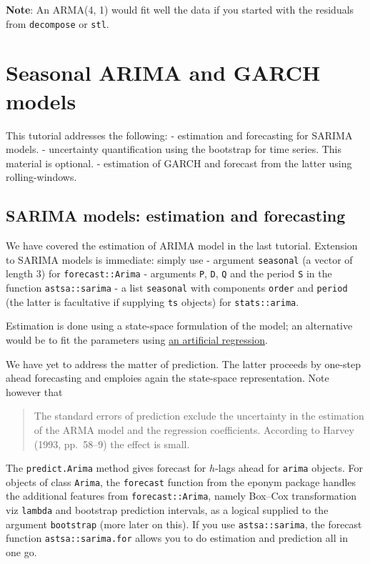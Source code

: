 \documentclass[]{book}
\begin{document}
\textbf{Note}: An ARMA(4, 1) would fit well the data if you started with
the residuals from \texttt{decompose} or \texttt{stl}.

\hypertarget{seasonal-arima-and-garch-models}{%
\chapter{Seasonal ARIMA and GARCH
models}\label{seasonal-arima-and-garch-models}}

This tutorial addresses the following: - estimation and forecasting for
SARIMA models. - uncertainty quantification using the bootstrap for time
series. This material is optional. - estimation of GARCH and forecast
from the latter using rolling-windows.

\hypertarget{sarima-models-estimation-and-forecasting}{%
\section{SARIMA models: estimation and
forecasting}\label{sarima-models-estimation-and-forecasting}}

We have covered the estimation of ARIMA model in the last tutorial.
Extension to SARIMA models is immediate: simply use - argument
\texttt{seasonal} (a vector of length 3) for \texttt{forecast::Arima} -
arguments \texttt{P}, \texttt{D}, \texttt{Q} and the period \texttt{S}
in the function \texttt{astsa::sarima} - a list \texttt{seasonal} with
components \texttt{order} and \texttt{period} (the latter is facultative
if supplying \texttt{ts} objects) for \texttt{stats::arima}.

Estimation is done using a state-space formulation of the model; an
alternative would be to fit the parameters using
\href{http://russell-davidson.arts.mcgill.ca/e761/mlzero3.pdf}{an
artificial regression}.

We have yet to address the matter of prediction. The latter proceeds by
one-step ahead forecasting and emploies again the state-space
representation. Note however that

\begin{quote}
The standard errors of prediction exclude the uncertainty in the
estimation of the ARMA model and the regression coefficients. According
to Harvey (1993, pp.~58--9) the effect is small.
\end{quote}

The \texttt{predict.Arima} method gives forecast for \(h\)-lags ahead
for \texttt{arima} objects. For objects of class \texttt{Arima}, the
\texttt{forecast} function from the eponym package handles the
additional features from \texttt{forecast::Arima}, namely Box--Cox
transformation viz \texttt{lambda} and bootstrap prediction intervals,
as a logical supplied to the argument \texttt{bootstrap} (more later on
this). If you use \texttt{astsa::sarima}, the forecast function
\texttt{astsa::sarima.for} allows you to do estimation and prediction
all in one go.
\end{document}
